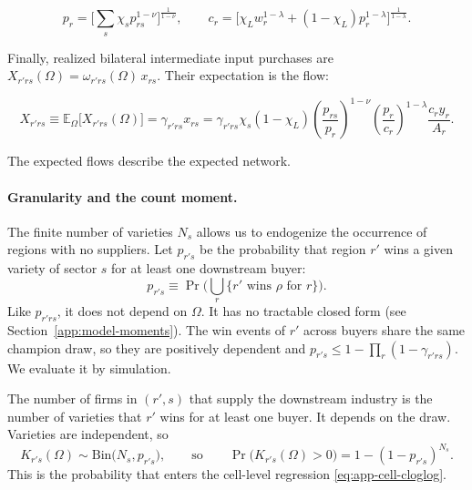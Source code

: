 \begin{equation}
p_{r} = \Big[\sum_s\chi_s p_{rs}^{1-\nu}\Big]^{\frac{1}{1-\nu}}, \qquad c_r = \Big[\chi_Lw_r^{1-\lambda} +(1-\chi_L)p_r^{1-\lambda}\Big]^{\frac{1}{1-\lambda}} .
\end{equation}
 
Finally, realized bilateral intermediate input purchases are $X_{r'rs}(\Omega)=\omega_{r'rs}(\Omega)\,x_{rs}$. Their expectation is the \cite{EatonKortum2002} flow:
 
\begin{equation}\label{eq:input_flows}
X_{r'rs} \equiv \mathbb{E}_\Omega\big[X_{r'rs}(\Omega)\big] = \gamma_{r'rs}x_{rs} = \gamma_{r'rs} \chi_s(1-\chi_L) \left(\frac{p_{rs}}{p_r}\right)^{1-\nu} \left(\frac{p_r}{c_r}\right)^{1-\lambda} \frac{c_ry_r}{A_r}.
\end{equation}
 
The expected flows describe the expected network. 
 
 

 
\paragraph{Granularity and the count moment.}\label{app:cloglog-count} The finite number of varieties $N_s$ allows us to endogenize the occurrence of regions with no suppliers. Let $p_{r's}$ be the probability that region $r'$ wins a given variety of sector $s$ for at least one downstream buyer:
\begin{equation}
p_{r's}\equiv\Pr\Big(\bigcup_{r}\{r' \text{ wins } \rho \text{ for } r\}\Big).
\label{eq:app-pwin}
\end{equation}
Like $p_{r'rs}$, it does not depend on $\Omega$. It has no tractable closed form (see Section~\ref{app:model-moments}). The win events of $r'$ across buyers share the same champion draw, so they are positively dependent and $p_{r's}\le 1-\prod_r(1-\gamma_{r'rs})$. We evaluate it by simulation.
 
The number of firms in $(r',s)$ that supply the downstream industry is the number of varieties that $r'$ wins for at least one buyer. It depends on the draw. Varieties are independent, so
\begin{equation}
K_{r's}(\Omega)\sim\mathrm{Bin}\big(N_s,p_{r's}\big),
\qquad\text{so}\qquad
\Pr\big(K_{r's}(\Omega)>0\big)=1-(1-p_{r's})^{N_s}.
\label{eq:app-K}
\end{equation}
This is the probability that enters the cell-level regression \eqref{eq:app-cell-cloglog}.

